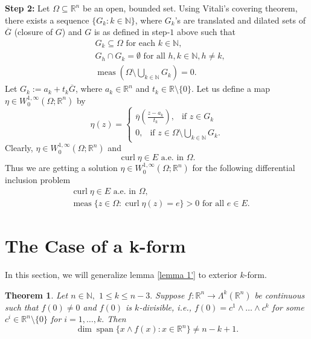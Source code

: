 \documentclass[11pt, a4paper, reqno]{amsart}
\numberwithin{equation}{section}
\newcommand{\spann}{\operatorname{span}}
\newcommand{\meas}{\operatorname{meas}}
\newcommand{\curl}{\operatorname{curl}}
\newtheorem{theorem}{Theorem}[section]
\begin{document}
\textbf{Step 2:} Let $\Omega \subseteq \mathbb R^n$ be an open, bounded set. Using Vitali's covering theorem, there exists a sequence $\{G_k: k\in \mathbb N\}$, where $G_k$'s are translated and dilated sets of $\overline{G}$ (closure of $G$) and $G$ is as defined in step-$1$ above such that 
\begin{align*}
    &G_k\subseteq \Omega \textrm{ for each } k\in \mathbb N,\\
   & G_h\cap G_k =\emptyset \textrm{ for all } h,k\in \mathbb N, h\neq k,\\
   & \meas \left( \Omega \setminus \bigcup_{k\in \mathbb N}G_k\right)=0.
\end{align*}
Let $G_k:= a_k+t_k \overline{G}$, where $a_k\in \mathbb R^n$ and $t_k\in \mathbb R\setminus \{0\}$. Let us define a map $\eta \in W_0^{1,\infty}(\Omega;\mathbb R^n)$ by 
\[
\eta(z)=
\begin{cases}
    \overline{\eta}\left(\frac{z-a_k}{t_k}\right), \ \ \textrm{ if } z\in G_k\\
    0, \ \ \textrm{ if } z\in \Omega \setminus \displaystyle\bigcup_{k\in \mathbb N}G_k .
\end{cases}
\]
Clearly, $\eta \in W_0^{1,\infty}(\Omega;\mathbb R^n)$ and $$\curl \eta \in E \textrm{ a.e. in }\Omega.$$
Thus we are getting a solution $\eta \in W_0^{1,\infty}(\Omega;\mathbb R^n)$ for the following differential inclusion problem 
\begin{align*}
&\curl \eta \in E \textrm{ a.e. in } \Omega,\\
& \meas \{z\in \Omega : \curl \eta(z)=e\}>0 \textrm{ for all } e\in E.
\end{align*}
\section{The Case of a k-form}
In this section, we will generalize lemma \ref{lemma 1'} to exterior $k$-form.
\begin{theorem}\label{06/04/2024 lemma 1}
Let $n\in \mathbb N,$ $1\leq k \leq n-3.$ Suppose $f:\mathbb R^n\to \Lambda^k(\mathbb R^n)$ be  continuous such that $f(0)\neq 0$ and $f(0)$ is $k$-divisible, i.e., $f(0)=c^1\wedge \ldots \wedge c^k$ for some $c^i\in \mathbb R^n\setminus \{0\}$ for  $i=1,\ldots, k.$ Then 
\begin{equation}\nonumber
\dim \spann \{x\wedge f(x): x\in \mathbb R^n\}\neq n-k+1.
\end{equation}

\end{theorem}
\end{document}
